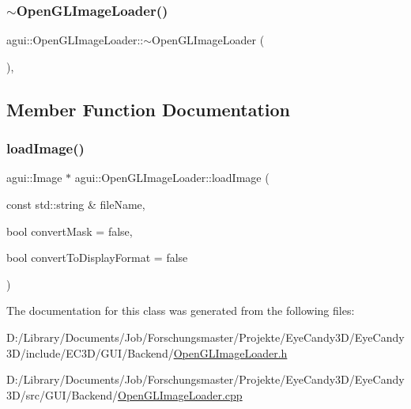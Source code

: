 \subsubsection{\texorpdfstring{$\sim$\+Open\+G\+L\+Image\+Loader()}{~OpenGLImageLoader()}}
{\footnotesize\ttfamily agui\+::\+Open\+G\+L\+Image\+Loader\+::$\sim$\+Open\+G\+L\+Image\+Loader (\begin{DoxyParamCaption}{ }\end{DoxyParamCaption})\hspace{0.3cm}{\ttfamily [virtual]}, {\ttfamily [default]}}



\subsection{Member Function Documentation}
\mbox{\label{classagui_1_1_open_g_l_image_loader_a2bba292e2c4aeb6108e8a7806b4d18c0}} 
\subsubsection{\texorpdfstring{load\+Image()}{loadImage()}}
{\footnotesize\ttfamily agui\+::\+Image $\ast$ agui\+::\+Open\+G\+L\+Image\+Loader\+::load\+Image (\begin{DoxyParamCaption}\item[{const std\+::string \&}]{file\+Name,  }\item[{bool}]{convert\+Mask = {\ttfamily false},  }\item[{bool}]{convert\+To\+Display\+Format = {\ttfamily false} }\end{DoxyParamCaption})\hspace{0.3cm}{\ttfamily [override]}}



The documentation for this class was generated from the following files\+:\begin{DoxyCompactItemize}
\item 
D\+:/\+Library/\+Documents/\+Job/\+Forschungsmaster/\+Projekte/\+Eye\+Candy3\+D/\+Eye\+Candy3\+D/include/\+E\+C3\+D/\+G\+U\+I/\+Backend/\mbox{\hyperlink{_open_g_l_image_loader_8h}{Open\+G\+L\+Image\+Loader.\+h}}\item 
D\+:/\+Library/\+Documents/\+Job/\+Forschungsmaster/\+Projekte/\+Eye\+Candy3\+D/\+Eye\+Candy3\+D/src/\+G\+U\+I/\+Backend/\mbox{\hyperlink{_open_g_l_image_loader_8cpp}{Open\+G\+L\+Image\+Loader.\+cpp}}\end{DoxyCompactItemize}
